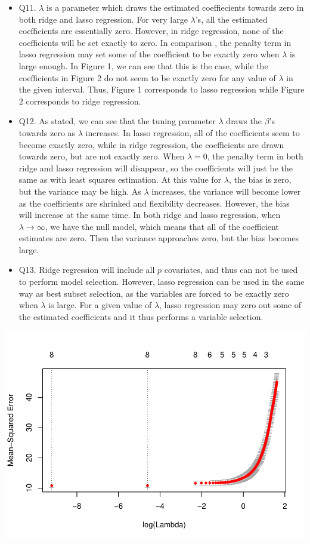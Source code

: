 \documentclass[]{article}
\begin{document}
\begin{itemize}
\item
  Q11. \(\lambda\) is a parameter which draws the estimated
  coeffiecients towards zero in both ridge and lasso regression. For
  very large \(\lambda\)'s, all the estimated coefficients are
  essentially zero. However, in ridge regression, none of the
  coefficients will be set exactly to zero. In comparison , the penalty
  term in lasso regression may set some of the coefficient to be exactly
  zero when \(\lambda\) is large enough. In Figure 1, we can see that
  this is the case, while the coefficients in Figure 2 do not seem to be
  exactly zero for any value of \(\lambda\) in the given interval. Thus,
  Figure 1 corresponds to lasso regression while Figure 2 corresponds to
  ridge regression.
\item
  Q12. As stated, we can see that the tuning parameter \(\lambda\) draws
  the \(\beta\)'s towards zero as \(\lambda\) increases. In lasso
  regression, all of the coefficients seem to become exactly zero, while
  in ridge regression, the coefficients are drawn towards zero, but are
  not exactly zero. When \(\lambda=0\), the penalty term in both ridge
  and lasso regression will disappear, so the coefficients will just be
  the same as with least squares estimation. At this value for
  \(\lambda\), the bias is zero, but the variance may be high. As
  \(\lambda\) increases, the variance will become lower as the
  coefficients are shrinked and flexibility decreases. However, the bias
  will increase at the same time. In both ridge and lasso regression,
  when \(\lambda \rightarrow \infty\), we have the null model, which
  means that all of the coefficient estimates are zero. Then the
  variance approaches zero, but the bias becomes large.
\item
  Q13. Ridge regression will include all \(p\) covariates, and thus can
  not be used to perform model selection. However, lasso regression can
  be used in the same way as best subset selection, as the variables are
  forced to be exactly zero when \(\lambda\) is large. For a given value
  of \(\lambda\), lasso regression may zero out some of the estimated
  coefficients and it thus performs a variable selection.
\end{itemize}

\includegraphics{Project2_files/figure-latex/unnamed-chunk-4-1.pdf}
\end{document}
